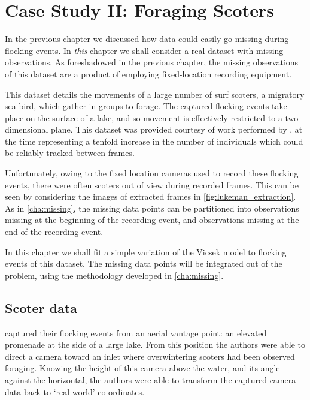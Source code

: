 \graphicspath{{fig/scoters/}}

\chapter{Case Study II: Foraging Scoters}
\label{cha:scoters}

In the previous chapter we discussed how data could easily go missing during
flocking events. In \emph{this} chapter we shall consider a real dataset with
missing observations. As foreshadowed in the previous chapter, the missing
observations of this dataset are a product of employing fixed-location
recording equipment.

This dataset details the movements of a large number of surf scoters, a
migratory sea bird, which gather in groups to forage. The captured flocking
events take place on the surface of a lake, and so movement is effectively
restricted to a two-dimensional plane. This dataset was provided courtesy of
work performed by \textcite{lukeman09,lukeman10}, at the time representing a
tenfold increase in the number of individuals which could be reliably tracked
between frames.

Unfortunately, owing to the fixed location cameras used to record these
flocking events, there were often scoters out of view during recorded frames.
This can be seen by considering the images of extracted frames in
\cref{fig:lukeman_extraction}. As in \cref{cha:missing}, the missing
data points can be partitioned into observations missing at the beginning of
the recording event, and observations missing at the end of the recording
event.

In this chapter we shall fit a simple variation of the Vicsek model to
flocking events of this dataset. The missing data points will be integrated out
of the problem, using the methodology developed in \cref{cha:missing}.

\section{Scoter data}

\textcite{lukeman10} captured their flocking events from an aerial vantage
point: an elevated promenade at the side of a large lake. From this position
the authors were able to direct a camera toward an inlet where overwintering
scoters had been observed foraging. Knowing the height of this camera above the
water, and its angle against the horizontal, the authors were able to transform
the captured camera data back to `real-world' co-ordinates.

